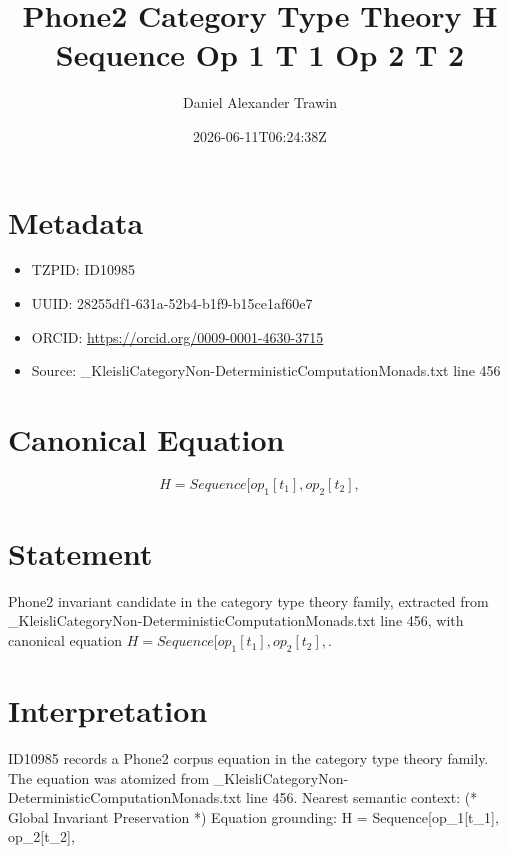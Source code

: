 \documentclass[11pt]{article}
\title{Phone2 Category Type Theory H Sequence Op 1 T 1 Op 2 T 2}
\author{Daniel Alexander Trawin}
\date{2026-06-11T06:24:38Z}
\begin{document}
\maketitle
\section*{Metadata}
\begin{itemize}
\item TZPID: ID10985
\item UUID: 28255df1-631a-52b4-b1f9-b15ce1af60e7
\item ORCID: \url{https://orcid.org/0009-0001-4630-3715}
\item Source: _KleisliCategoryNon-DeterministicComputationMonads.txt line 456
\end{itemize}
\section*{Canonical Equation}
\[
H = Sequence[op_1[t_1], op_2[t_2],
\]
\section*{Statement}
Phone2 invariant candidate in the category type theory family, extracted from _KleisliCategoryNon-DeterministicComputationMonads.txt line 456, with canonical equation $H = Sequence[op_1[t_1], op_2[t_2],$.
\section*{Interpretation}
ID10985 records a Phone2 corpus equation in the category type theory family. The equation was atomized from _KleisliCategoryNon-DeterministicComputationMonads.txt line 456. Nearest semantic context: (* Global Invariant Preservation *) Equation grounding: H = Sequence[op_1[t_1], op_2[t_2],
\end{document}
